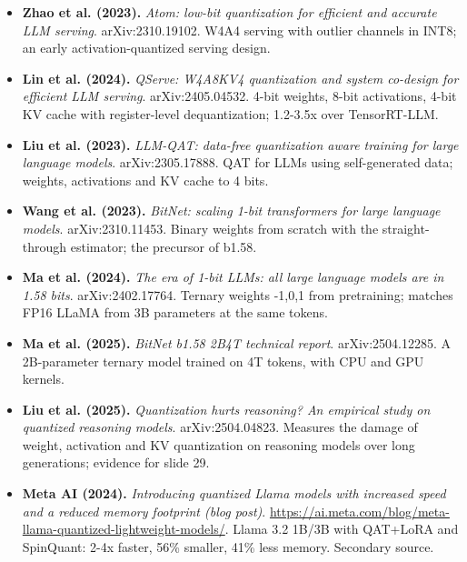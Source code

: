 \documentclass[11pt,letterpaper]{article}
\begin{document}
\begin{itemize}[leftmargin=1.2em,itemsep=3pt]
\item \textbf{Zhao et al. (2023).} \textit{Atom: low-bit quantization for efficient and accurate LLM serving}. arXiv:2310.19102. W4A4 serving with outlier channels in INT8; an early activation-quantized serving design.
\item \textbf{Lin et al. (2024).} \textit{QServe: W4A8KV4 quantization and system co-design for efficient LLM serving}. arXiv:2405.04532. 4-bit weights, 8-bit activations, 4-bit KV cache with register-level dequantization; 1.2-3.5x over TensorRT-LLM.
\item \textbf{Liu et al. (2023).} \textit{LLM-QAT: data-free quantization aware training for large language models}. arXiv:2305.17888. QAT for LLMs using self-generated data; weights, activations and KV cache to 4 bits.
\item \textbf{Wang et al. (2023).} \textit{BitNet: scaling 1-bit transformers for large language models}. arXiv:2310.11453. Binary weights from scratch with the straight-through estimator; the precursor of b1.58.
\item \textbf{Ma et al. (2024).} \textit{The era of 1-bit LLMs: all large language models are in 1.58 bits}. arXiv:2402.17764. Ternary weights {-1,0,1} from pretraining; matches FP16 LLaMA from 3B parameters at the same tokens.
\item \textbf{Ma et al. (2025).} \textit{BitNet b1.58 2B4T technical report}. arXiv:2504.12285. A 2B-parameter ternary model trained on 4T tokens, with CPU and GPU kernels.
\item \textbf{Liu et al. (2025).} \textit{Quantization hurts reasoning? An empirical study on quantized reasoning models}. arXiv:2504.04823. Measures the damage of weight, activation and KV quantization on reasoning models over long generations; evidence for slide 29.
\item \textbf{Meta AI (2024).} \textit{Introducing quantized Llama models with increased speed and a reduced memory footprint (blog post)}. \url{https://ai.meta.com/blog/meta-llama-quantized-lightweight-models/}. Llama 3.2 1B/3B with QAT+LoRA and SpinQuant: 2-4x faster, 56\% smaller, 41\% less memory. Secondary source.
\end{itemize}
\end{document}
